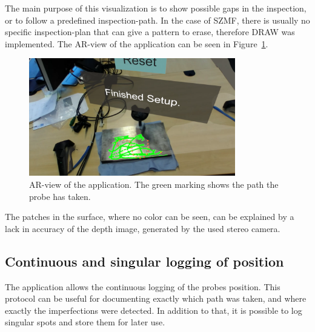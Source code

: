 \documentclass{VRARWorkshop}
\begin{document}
The main purpose of this visualization is to show possible gaps in the inspection, or to follow a predefined inspection-path.
In the case of SZMF, there is usually no specific inspection-plan that can give a pattern to erase, therefore {\sc DRAW} was implemented.
The AR-view of the application can be seen in Figure~\ref{fig:ARView}.

\begin{figure}[h!]
    \begin{center}
        \includegraphics[width=90mm]{images/AR-Screenshot}
        \caption{\label{fig:ARView} AR-view of the application. The green marking shows the path the probe has taken.}
    \end{center}
\end{figure}

The patches in the surface, where no color can be seen, can be explained by a lack in accuracy of the depth image, generated by the used stereo camera.

\subsection{Continuous and singular logging of position}
The application allows the continuous logging of the probes position.
This protocol can be useful for documenting exactly which path was taken, and where exactly the imperfections were detected.
In addition to that, it is possible to log singular spots and store them for later use.
\end{document}
